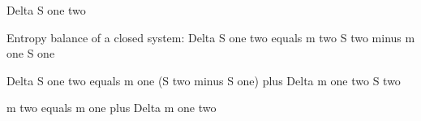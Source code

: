 Delta S one two  

Entropy balance of a closed system:  
Delta S one two equals m two S two minus m one S one  

Delta S one two equals m one (S two minus S one) plus Delta m one two S two  

m two equals m one plus Delta m one two